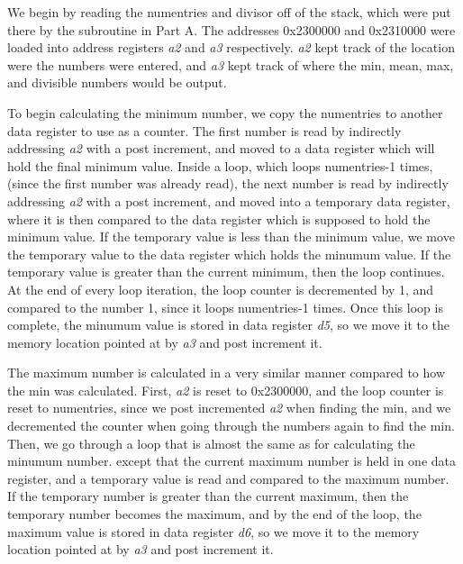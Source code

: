 \documentclass[letterpaper]{article}
\begin{document}
    We begin by reading the numentries and divisor off of the stack, which
    were put there by the subroutine in Part A. The addresses 0x2300000
    and 0x2310000 were loaded into address registers \textit{a2} and \textit{a3} respectively.
    \textit{a2} kept track of the location were the numbers were entered, and \textit{a3}
    kept track of where the min, mean, max, and divisible numbers would be output.

    To begin calculating the minimum number, we copy the numentries to another
    data register to use as a counter. The first number is read by indirectly addressing
    \textit{a2} with a post increment, and moved to a data register which will hold the
    final minimum value. Inside a loop, which loops numentries-1
    times, (since the first number was already read), the next number is read by indirectly
    addressing \textit{a2} with a post increment, and
    moved into a temporary data register, where it is then compared to the data register
    which is supposed to hold the minimum value. If the temporary value is less than the
    minimum value, we move the temporary value to the data register which holds the minumum value.
    If the temporary value is greater than the current minimum, then the loop continues.
    At the end of every loop iteration, the loop counter is decremented by 1, and compared
    to the number 1, since it loops numentries-1 times. Once this loop is complete,
    the minumum value is stored in data register \textit{d5}, so we move it to
    the memory location pointed at by \textit{a3} and post increment it.

    The maximum number is calculated in a very similar manner compared to how
    the min was calculated. First, \textit{a2} is reset to 0x2300000, and the loop counter
    is reset to numentries, since we post
    incremented \textit{a2} when finding the min, and we decremented the counter
    when going through the numbers again to find the min.
    Then, we go through a loop that is almost the same as for calculating the minumum number.
    except that the current maximum number is held in one data register,
    and a temporary value is read and compared to the maximum number. If the temporary
    number is greater than the current maximum, then the temporary number becomes the
    maximum, and by the end of the loop, the maximum value is stored in data register \textit{d6},
    so we move it to
    the memory location pointed at by \textit{a3} and post increment it.
\end{document}
